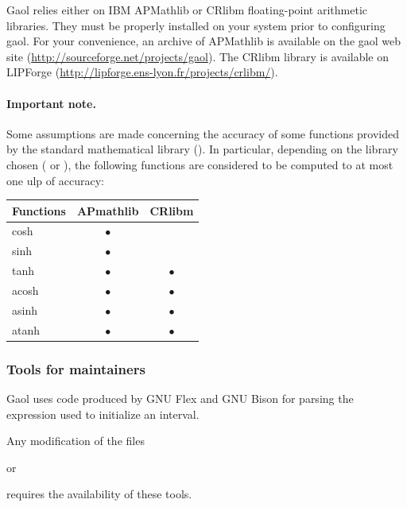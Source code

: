 \documentclass{manual}
\begin{document}
Gaol relies either on IBM APMathlib or CRlibm floating-point arithmetic libraries. They must be
properly installed on your system prior to configuring gaol. For your convenience,
an archive of APMathlib is available on the gaol web site (\url{http://sourceforge.net/projects/gaol}).
The CRlibm library is available on LIPForge (\url{http://lipforge.ens-lyon.fr/projects/crlibm/}).
%

\paragraph{Important note.} Some assumptions are made concerning the accuracy of some functions provided by the standard
mathematical library (). In particular, depending on the library chosen ( or ),
the following functions are considered to be computed to at most one ulp of accuracy:
\begin{center}
 \begin{tabular}{l|cc}
	\hline
	Functions & \textbf{APmathlib} & \textbf{CRlibm}\\
	\hline
	cosh      &  $\bullet$ & \\
	sinh      &  $\bullet$ & \\
	tanh      &  $\bullet$ & $\bullet$\\
	acosh     &  $\bullet$ & $\bullet$\\
	asinh     &  $\bullet$ & $\bullet$\\
	atanh     &  $\bullet$ & $\bullet$\\
	\hline
 \end{tabular}
\end{center}


\subsubsection{Tools for maintainers}

Gaol uses code produced by GNU Flex and GNU Bison for parsing the expression used to
initialize an interval.
%
%

Any modification of the files
\begin{center}
\end{center}
\noindent or
\begin{center}
\end{center}
requires the availability of these tools.
\end{document}
